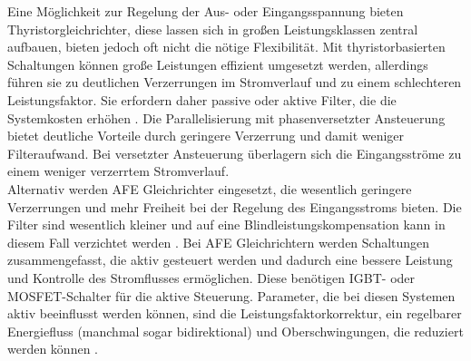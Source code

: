 		Eine Möglichkeit zur Regelung der Aus- oder Eingangsspannung bieten Thyristorgleichrichter, diese lassen sich in großen Leistungsklassen zentral aufbauen, bieten jedoch oft nicht die nötige Flexibilität. 
		Mit thyristorbasierten Schaltungen können große Leistungen effizient umgesetzt werden, allerdings führen sie zu deutlichen Verzerrungen im Stromverlauf und zu einem schlechteren Leistungsfaktor. Sie erfordern daher passive oder aktive Filter, die die Systemkosten erhöhen \cite{HydrogenElectronicTopologies}. Die Parallelisierung mit phasenversetzter Ansteuerung bietet deutliche Vorteile durch geringere Verzerrung und damit weniger Filteraufwand. Bei versetzter Ansteuerung überlagern sich die Eingangsströme zu einem weniger verzerrtem Stromverlauf.\\
		Alternativ werden \gls{AFE} Gleichrichter eingesetzt, die wesentlich geringere Verzerrungen und mehr Freiheit bei der Regelung des Eingangsstroms bieten. Die Filter sind wesentlich kleiner und auf eine Blindleistungskompensation kann in diesem Fall verzichtet werden \cite{HydrogenElectronicTopologies}. Bei \gls{AFE} Gleichrichtern werden Schaltungen zusammengefasst, die aktiv gesteuert werden und dadurch eine bessere Leistung und Kontrolle des Stromflusses ermöglichen. Diese benötigen \gls{IGBT}- oder \gls{MOSFET}-Schalter für die aktive Steuerung. Parameter, die bei diesen Systemen aktiv beeinflusst werden können, sind die Leistungsfaktorkorrektur, ein regelbarer Energiefluss (manchmal sogar bidirektional) und Oberschwingungen, die reduziert werden können \cite{HydrogenElectronicTopologies}.
